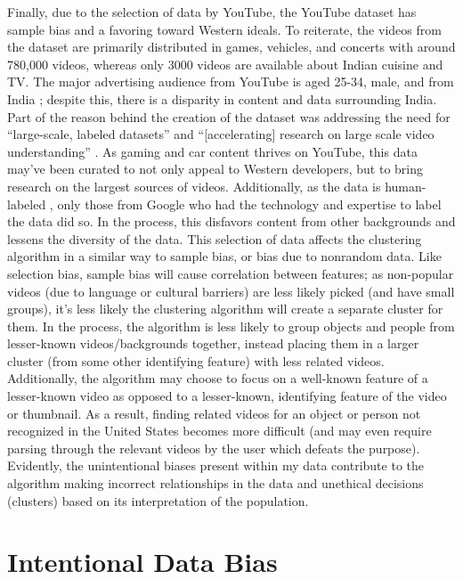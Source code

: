 \documentclass[10pt,twocolumn]{article}
\begin{document}
Finally, due to the selection of data by YouTube, the YouTube dataset has sample bias and a favoring toward Western ideals. To reiterate, the videos from the dataset are primarily distributed in games, vehicles, and concerts with around 780,000 videos, whereas only 3000 videos are available about Indian cuisine and TV. The major advertising audience from YouTube is aged 25-34, male, and from India \cite{HootSuite2022}; despite this, there is a disparity in content and data surrounding India. Part of the reason behind the creation of the dataset was addressing the need for “large-scale, labeled datasets” and “[accelerating] research on large scale video understanding” \cite{Warrick2020}. As gaming and car content thrives on YouTube, this data may’ve been curated to not only appeal to Western developers, but to bring research on the largest sources of videos. Additionally, as the data is human-labeled \cite{googleYT8M}, only those from Google who had the technology and expertise to label the data did so. In the process, this disfavors content from other backgrounds and lessens the diversity of the data. This selection of data affects the clustering algorithm in a similar way to sample bias, or bias due to nonrandom data. Like selection bias, sample bias will cause correlation between features; as non-popular videos (due to language or cultural barriers) are less likely picked (and have small groups), it’s less likely the clustering algorithm will create a separate cluster for them. In the process, the algorithm is less likely to group objects and people from lesser-known videos/backgrounds together, instead placing them in a larger cluster (from some other identifying feature) with less related videos. Additionally, the algorithm may choose to focus on a well-known feature of a lesser-known video as opposed to a lesser-known, identifying feature of the video or thumbnail. As a result, finding related videos for an object or person not recognized in the United States becomes more difficult (and may even require parsing through the relevant videos by the user which defeats the purpose). Evidently, the unintentional biases present within my data contribute to the algorithm making incorrect relationships in the data and unethical decisions (clusters) based on its interpretation of the population.

\section {Intentional Data Bias}
\end{document}
